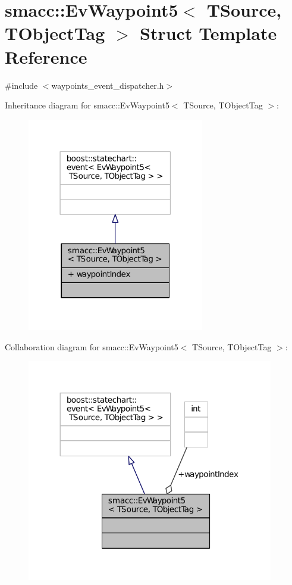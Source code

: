 \hypertarget{structsmacc_1_1EvWaypoint5}{}\section{smacc\+:\+:Ev\+Waypoint5$<$ T\+Source, T\+Object\+Tag $>$ Struct Template Reference}
\label{structsmacc_1_1EvWaypoint5}


{\ttfamily \#include $<$waypoints\+\_\+event\+\_\+dispatcher.\+h$>$}



Inheritance diagram for smacc\+:\+:Ev\+Waypoint5$<$ T\+Source, T\+Object\+Tag $>$\+:
\nopagebreak
\begin{figure}[H]
\begin{center}
\leavevmode
\includegraphics[width=219pt]{structsmacc_1_1EvWaypoint5__inherit__graph}
\end{center}
\end{figure}


Collaboration diagram for smacc\+:\+:Ev\+Waypoint5$<$ T\+Source, T\+Object\+Tag $>$\+:
\nopagebreak
\begin{figure}[H]
\begin{center}
\leavevmode
\includegraphics[width=305pt]{structsmacc_1_1EvWaypoint5__coll__graph}
\end{center}
\end{figure}
